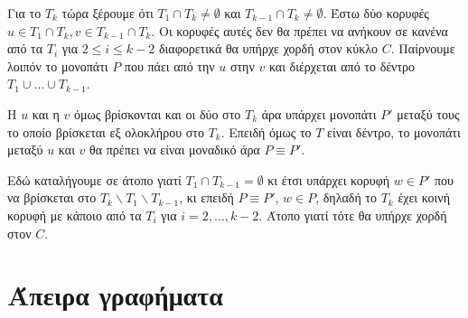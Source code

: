 \documentclass[a4paper, oneside, 11pt]{article}
\theoremstyle{definition}
\begin{document}
\begin{enumerate}
   Για το $T_k$ τώρα ξέρουμε ότι $T_1 \cap T_k \neq \emptyset$
   και $T_{k-1} \cap T_{k} \neq \emptyset$. Έστω δύο κορυφές
   $u \in T_1 \cap T_{k}, v \in T_{k-1} \cap T_k$. Οι κορυφές αυτές
   δεν θα πρέπει να ανήκουν σε κανένα από τα $T_i$ για $2 \leq i \leq k-2$
   διαφορετικά θα υπήρχε χορδή στον κύκλο $C$. Παίρνουμε λοιπόν
   το μονοπάτι $P$ που πάει από την $u$ στην $v$ και διέρχεται από
   το δέντρο $T_1 \cup \ldots \cup T_{k-1}$.

   Η $u$ και η $v$ όμως βρίσκονται και οι δύο στο $T_k$ άρα υπάρχει
   μονοπάτι $P'$ μεταξύ τους το οποίο βρίσκεται εξ ολοκλήρου στο
   $T_k$.
   Επειδή όμως το $T$ είναι δέντρο, το μονοπάτι μεταξύ $u$ και
   $v$ θα πρέπει να είναι μοναδικό άρα $P \equiv P'$.


   Εδώ καταλήγουμε σε άτοπο γιατί $T_1 \cap T_{k-1} = \emptyset$ κι έτσι
   υπάρχει κορυφή $w \in P'$ που να βρίσκεται στο $T_k \backslash T_1
   \backslash T_{k-1}$, κι επειδή $P \equiv P'$,
   $w \in P$, δηλαδή το $T_k$ έχει κοινή κορυφή με κάποιο από τα
   $T_i$ για $i = 2, \ldots, k-2$. Άτοπο γιατί τότε θα υπήρχε χορδή
   στον $C$.
\end{enumerate}

\section{Άπειρα γραφήματα}
\end{document}
